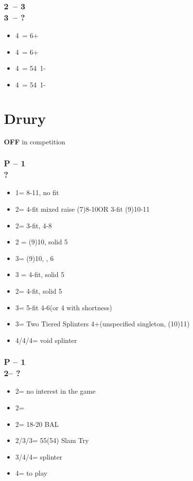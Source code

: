 \subsubsection*{2\ntx\ -- 3\spades \\ 3\nt\ -- ?}
\begin{itemize}
    \item 4\clubs\ = 6+\clubs
    \item 4\diams\ = 6+\diams
    \item 4\hearts\ = 54\minor\ 1-\hearts
    \item 4\spades\ = 54\minor\ 1-\spades
\end{itemize}

\section{\texorpdfstring{Drury}{drury}}\label{sec:drury}

{\textbf{OFF}} in competition

\subsubsection*{P -- 1\majs \\ ?}
\begin{itemize}
    \item 1\nt = 8-11, no fit
    \item 2\clubs = 4-fit mixed raise (7)8-10\dps OR 3-fit (9)10-11\dps
    \item 2\majs = 3-fit, 4-8\dps
    \item 2 = (9)10, solid 5
    \item 3\clubs = (9)10, \inv, 6\clubs
    \item 3 = 4-fit, solid 5
    \item 2\nt = 4-fit, solid 5\clubs
    \item 3\majs = 5-fit 4-6\dps (or 4 with shortness)
    \item 3\nt = Two Tiered Splinters 4+\majs (unspecified singleton, (10)11\dps)
    \item 4\clubs/4\diams/4\hearts = void splinter
\end{itemize}

\subsubsection*{P -- 1\hearts \\ 2\clubs -- ?}
\begin{itemize}
    \item 2\hearts = no interest in the game
    \item 2\diams = \inv
    \item 2\nt = 18-20 BAL
    \item 2\spades/3\clubs/3\diams = 55(54) Slam Try
    \item 3\spades/4\clubs/4\diams = splinter
    \item 4\hearts = to play
\end{itemize}

